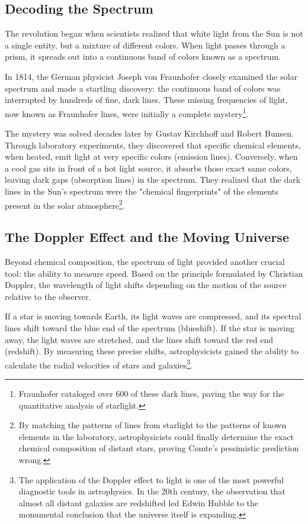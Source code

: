 \documentclass[10pt,a4paper]{article}
\begin{document}
\subsection{Decoding the Spectrum}
The revolution began when scientists realized that white light from the Sun is not a single entity, but a mixture of different colors. When light passes through a prism, it spreads out into a continuous band of colors known as a spectrum. 

In 1814, the German physicist Joseph von Fraunhofer closely examined the solar spectrum and made a startling discovery: the continuous band of colors was interrupted by hundreds of fine, dark lines. These missing frequencies of light, now known as Fraunhofer lines, were initially a complete mystery\footnote{ Fraunhofer cataloged over 600 of these dark lines, paving the way for the quantitative analysis of starlight.}.

The mystery was solved decades later by Gustav Kirchhoff and Robert Bunsen. Through laboratory experiments, they discovered that specific chemical elements, when heated, emit light at very specific colors (emission lines). Conversely, when a cool gas sits in front of a hot light source, it absorbs those exact same colors, leaving dark gaps (absorption lines) in the spectrum. They realized that the dark lines in the Sun's spectrum were the "chemical fingerprints" of the elements present in the solar atmosphere\footnote{By matching the patterns of lines from starlight to the patterns of known elements in the laboratory, astrophysicists could finally determine the exact chemical composition of distant stars, proving Comte's pessimistic prediction wrong.}.

\subsection{The Doppler Effect and the Moving Universe}
Beyond chemical composition, the spectrum of light provided another crucial tool: the ability to measure speed. Based on the principle formulated by Christian Doppler, the wavelength of light shifts depending on the motion of the source relative to the observer. 

If a star is moving towards Earth, its light waves are compressed, and its spectral lines shift toward the blue end of the spectrum (blueshift). If the star is moving away, the light waves are stretched, and the lines shift toward the red end (redshift). By measuring these precise shifts, astrophysicists gained the ability to calculate the radial velocities of stars and galaxies\footnote{The application of the Doppler effect to light is one of the most powerful diagnostic tools in astrophysics. In the 20th century, the observation that almost all distant galaxies are redshifted led Edwin Hubble to the monumental conclusion that the universe itself is expanding.}.
\end{document}
